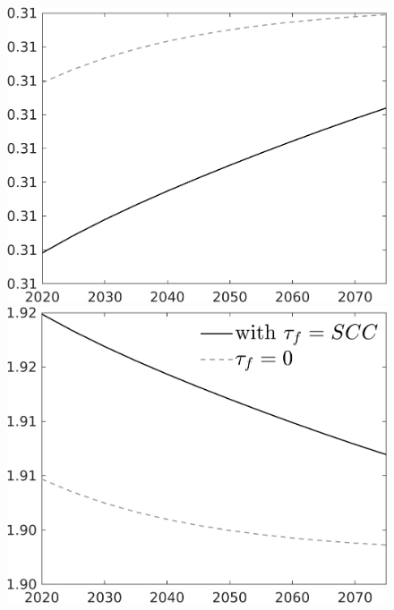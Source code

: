 \documentclass[12pt]{article}
\begin{document}
\begin{figure}[h!!]
\begin{minipage}[]{0.32\textwidth}
	\end{minipage}	
\begin{minipage}[]{0.32\textwidth}
\includegraphics[width=1\textwidth]{../../codding_model/own_basedOnFried/optimalPol_010922_revision/figures/all_13Sept22/LevTaufNoTauf_TaulCalib_Equlab_regime0_hl_spillover0_nsk0_xgr1_knspil1_sep1_LFlimit0_emsbase0_countec0_GovRev0_etaa0.79_lgd0.png}
\end{minipage}	
\begin{minipage}[]{0.32\textwidth}
\includegraphics[width=1\textwidth]{../../codding_model/own_basedOnFried/optimalPol_010922_revision/figures/all_13Sept22/LevTaufNoTauf_TaulCalib_Equlab_regime0_whwl_spillover0_nsk0_xgr1_knspil1_sep1_LFlimit0_emsbase0_countec0_GovRev0_etaa0.79_lgd1.png}

\end{minipage}
\end{figure}
\end{document}
